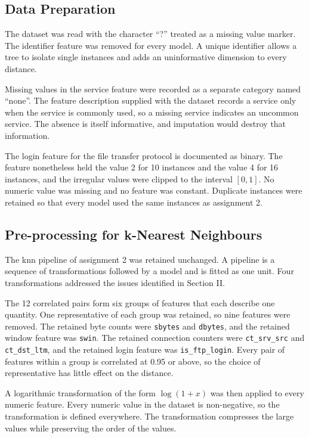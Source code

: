 \documentclass[conference]{IEEEtran}
\begin{document}
\subsection{Data Preparation}

The dataset was read with the character ``?'' treated as a missing value marker.
The identifier feature was removed for every model. A unique identifier allows a
tree to isolate single instances and adds an uninformative dimension to every
distance.

Missing values in the service feature were recorded as a separate category named
``none''. The feature description supplied with the dataset records a service only
when the service is commonly used, so a missing service indicates an uncommon
service. The absence is itself informative, and imputation would destroy that
information.

The login feature for the file transfer protocol is documented as binary. The
feature nonetheless held the value 2 for 10 instances and the value 4 for 16
instances, and the irregular values were clipped to the interval $[0, 1]$. No
numeric value was missing and no feature was constant. Duplicate instances were
retained so that every model used the same instances as assignment 2.

\subsection{Pre-processing for k-Nearest Neighbours}

The \gls{knn} pipeline of assignment 2 was retained unchanged. A pipeline is a
sequence of transformations followed by a model and is fitted as one unit. Four
transformations addressed the issues identified in Section II.

The 12 correlated pairs form six groups of features that each describe one
quantity. One representative of each group was retained, so nine features were
removed. The retained byte counts were \texttt{sbytes} and \texttt{dbytes}, and the
retained window feature was \texttt{swin}. The retained connection counters were
\texttt{ct\_srv\_src} and \texttt{ct\_dst\_ltm}, and the retained login feature was
\texttt{is\_ftp\_login}. Every pair of features within a group is correlated at 0.95
or above, so the choice of representative has little effect on the distance.

A logarithmic transformation of the form $\log(1+x)$ was then applied to every
numeric feature. Every numeric value in the dataset is non-negative, so the
transformation is defined everywhere. The transformation compresses the large
values while preserving the order of the values.
\end{document}
